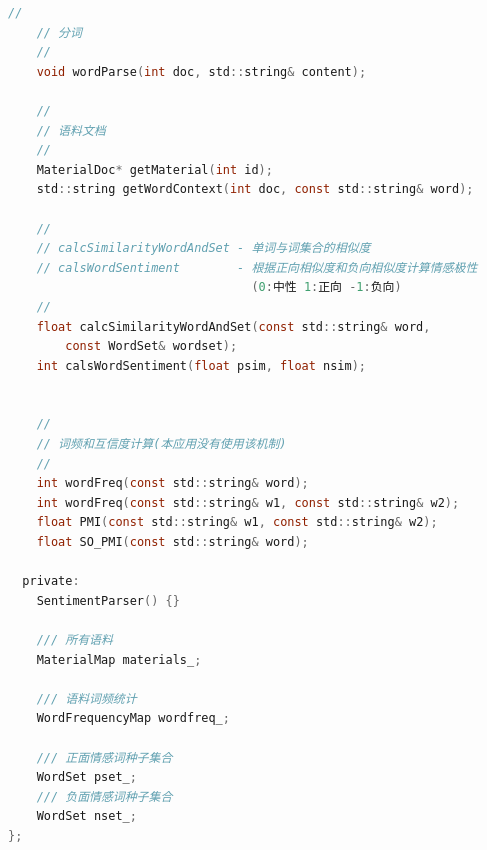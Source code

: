 \documentclass[11pt,a4paper]{article}
\begin{document}
{\begin{lstlisting}[language=C]
    //
    // 分词
    //
    void wordParse(int doc, std::string& content);

    //
    // 语料文档
    //
    MaterialDoc* getMaterial(int id);
    std::string getWordContext(int doc, const std::string& word);

    //
    // calcSimilarityWordAndSet - 单词与词集合的相似度
    // calsWordSentiment        - 根据正向相似度和负向相似度计算情感极性
                                  (0:中性 1:正向 -1:负向)
    //
    float calcSimilarityWordAndSet(const std::string& word, 
    	const WordSet& wordset);
    int calsWordSentiment(float psim, float nsim);


    //
    // 词频和互信度计算(本应用没有使用该机制)
    //
    int wordFreq(const std::string& word);
    int wordFreq(const std::string& w1, const std::string& w2);
    float PMI(const std::string& w1, const std::string& w2);
    float SO_PMI(const std::string& word);
    
  private:
    SentimentParser() {}

    /// 所有语料
    MaterialMap materials_;

    /// 语料词频统计
    WordFrequencyMap wordfreq_;

    /// 正面情感词种子集合
    WordSet pset_;
    /// 负面情感词种子集合
    WordSet nset_;
};
\end{lstlisting}}
\end{document}
